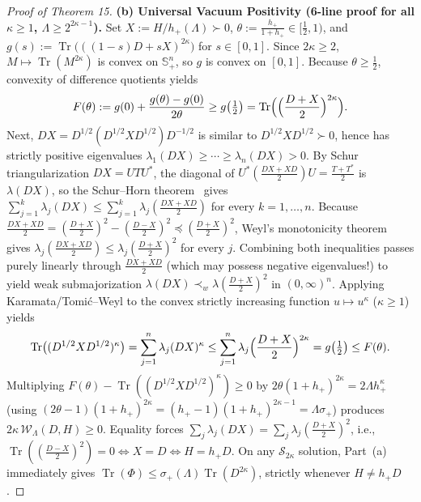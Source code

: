 \documentclass[10pt,letterpaper]{article}
\newcommand{\Tr}{\operatorname{Tr}}
\begin{document}
\begin{proof}[Proof of Theorem 15]
\textbf{(b) Universal Vacuum Positivity (6-line proof for all $\kappa \ge 1$, $\Lambda \ge 2^{2\kappa-1}$).}
Set $X := H/h_+(\Lambda) \succ 0$, $\theta := \frac{h_+}{1 + h_+} \in [\frac{1}{2}, 1)$, and $g(s) := \Tr\bigl(((1-s)D + s X)^{2\kappa}\bigr)$ for $s \in [0, 1]$. Since $2\kappa \ge 2$, $M \mapsto \Tr(M^{2\kappa})$ is convex on $\mathbb{S}_+^n$, so $g$ is convex on $[0, 1]$. Because $\theta \ge \frac{1}{2}$, convexity of difference quotients yields
\[
  F(\theta) := g(0) + \frac{g(\theta) - g(0)}{2\theta} \ge g\bigl(\tfrac{1}{2}\bigr) = \Tr\Bigl(\Bigl(\frac{D + X}{2}\Bigr)^{2\kappa}\Bigr).
\]
Next, $DX = D^{1/2}(D^{1/2} X D^{1/2})D^{-1/2}$ is similar to $D^{1/2} X D^{1/2} \succ 0$, hence has strictly positive eigenvalues $\lambda_1(DX) \ge \cdots \ge \lambda_n(DX) > 0$. By Schur triangularization $DX = U T U^*$, the diagonal of $U^*(\frac{DX+XD}{2})U = \frac{T+T^*}{2}$ is $\lambda(DX)$, so the Schur--Horn theorem~\cite{Bhatia1997} gives $\sum_{j=1}^k \lambda_j(DX) \le \sum_{j=1}^k \lambda_j(\frac{DX+XD}{2})$ for every $k = 1,\dots,n$. Because $\frac{DX+XD}{2} = (\frac{D+X}{2})^2 - (\frac{D-X}{2})^2 \preceq (\frac{D+X}{2})^2$, Weyl's monotonicity theorem gives $\lambda_j(\frac{DX+XD}{2}) \le \lambda_j(\frac{D+X}{2})^2$ for every $j$. Combining both inequalities passes purely linearly through $\frac{DX+XD}{2}$ (which may possess negative eigenvalues!) to yield weak submajorization $\lambda(DX) \prec_w \lambda(\frac{D+X}{2})^2$ in $(0,\infty)^n$. Applying Karamata/Tomi\'c--Weyl to the convex strictly increasing function $u \mapsto u^\kappa$ ($\kappa \ge 1$) yields
\[
  \Tr\bigl((D^{1/2} X D^{1/2})^\kappa\bigr) = \sum_{j=1}^n \lambda_j(DX)^\kappa \le \sum_{j=1}^n \lambda_j\Bigl(\frac{D + X}{2}\Bigr)^{2\kappa} = g\bigl(\tfrac{1}{2}\bigr) \le F(\theta).
\]
Multiplying $F(\theta) - \Tr((D^{1/2} X D^{1/2})^\kappa) \ge 0$ by $2\theta(1+h_+)^{2\kappa} = 2\Lambda h_+^\kappa$ (using $(2\theta-1)(1+h_+)^{2\kappa} = (h_+-1)(1+h_+)^{2\kappa-1} = \Lambda\sigma_+$) produces $2\kappa\,\mathcal{W}_\Lambda(D, H) \ge 0$. Equality forces $\sum_j \lambda_j(DX) = \sum_j \lambda_j(\frac{D+X}{2})^2$, i.e., $\Tr((\frac{D-X}{2})^2) = 0 \iff X = D \iff H = h_+ D$. On any $\mathcal{S}_{2\kappa}$ solution, Part~(a) immediately gives $\Tr(\Phi) \le \sigma_+(\Lambda)\Tr(D^{2\kappa})$, strictly whenever $H \neq h_+ D$.


\end{proof}
\end{document}
